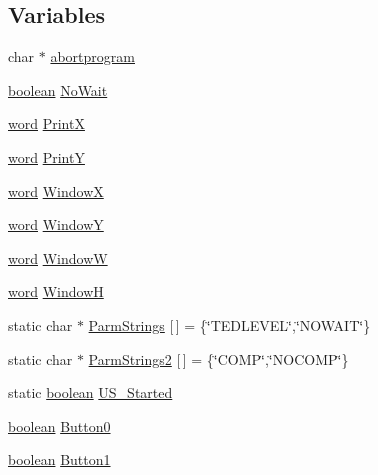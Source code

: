 \subsection*{Variables}
\begin{DoxyCompactItemize}
\item 
char $\ast$ \hyperlink{ID__US__1_8C_a4af009c4eb68eb1aaa0a93c8bffb3512}{abortprogram}
\item 
\hyperlink{ID__HEAD_8H_a7c6368b321bd9acd0149b030bb8275ed}{boolean} \hyperlink{ID__US__1_8C_aac051dcdf0618ac25f7661d8c6ddd82c}{NoWait}
\item 
\hyperlink{ID__HEAD_8H_abad51e07ab6d26bec9f1f786c8d65bcd}{word} \hyperlink{ID__US__1_8C_af88ed0e04fa671a4e672334f1e0c4828}{PrintX}
\item 
\hyperlink{ID__HEAD_8H_abad51e07ab6d26bec9f1f786c8d65bcd}{word} \hyperlink{ID__US__1_8C_a9ba4b756f739163c3d3d5736cba818a4}{PrintY}
\item 
\hyperlink{ID__HEAD_8H_abad51e07ab6d26bec9f1f786c8d65bcd}{word} \hyperlink{ID__US__1_8C_a961df5c1b62bed0978a9e2948458a05c}{WindowX}
\item 
\hyperlink{ID__HEAD_8H_abad51e07ab6d26bec9f1f786c8d65bcd}{word} \hyperlink{ID__US__1_8C_a8bde891542c367fab8f3a9dfb9d2250e}{WindowY}
\item 
\hyperlink{ID__HEAD_8H_abad51e07ab6d26bec9f1f786c8d65bcd}{word} \hyperlink{ID__US__1_8C_a417e7f10e3b946e0ce329aff1b619c3f}{WindowW}
\item 
\hyperlink{ID__HEAD_8H_abad51e07ab6d26bec9f1f786c8d65bcd}{word} \hyperlink{ID__US__1_8C_aaeba48e7e4c3c27582d73da5718a0c0c}{WindowH}
\item 
static char $\ast$ \hyperlink{ID__US__1_8C_af8599e1c1fbb3afabbdaa22e7c4a94b0}{ParmStrings} \mbox{[}$\,$\mbox{]} = \{\char`\"{}TEDLEVEL\char`\"{},\char`\"{}NOWAIT\char`\"{}\}
\item 
static char $\ast$ \hyperlink{ID__US__1_8C_ad4497d0cefc587c9101b54729d150f1c}{ParmStrings2} \mbox{[}$\,$\mbox{]} = \{\char`\"{}COMP\char`\"{},\char`\"{}NOCOMP\char`\"{}\}
\item 
static \hyperlink{ID__HEAD_8H_a7c6368b321bd9acd0149b030bb8275ed}{boolean} \hyperlink{ID__US__1_8C_a587d3155d7e2c62fe813cffece29ca13}{US\_\-Started}
\item 
\hyperlink{ID__HEAD_8H_a7c6368b321bd9acd0149b030bb8275ed}{boolean} \hyperlink{ID__US__1_8C_a7fa08780907017f971b2dc0909bd77fd}{Button0}
\item 
\hyperlink{ID__HEAD_8H_a7c6368b321bd9acd0149b030bb8275ed}{boolean} \hyperlink{ID__US__1_8C_aca6b2fe999220340d0569ece03a0026d}{Button1}

\end{DoxyCompactItemize}
